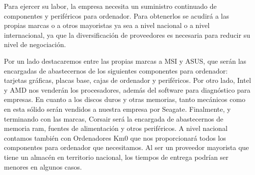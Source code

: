Para ejercer su labor, la empresa necesita un suministro continuado de componentes y periféricos para ordenador. Para obtenerlos se acudirá a las propias marcas o a otros mayoristas ya sea a nivel nacional o a nivel internacional, ya que la diversificación de proveedores es necesaria para reducir su nivel de negociación.

Por un lado destacaremos entre las propias marcas a MSI y ASUS, que serán las encargadas de abastecernos de los siguientes componentes para ordenador: tarjetas gráficas, placas base, cajas de ordenador y periféricos. Por otro lado, Intel y AMD nos venderán los procesadores, además del software para diagnóstico para empresas. En cuanto a los discos duros y otras memorias, tanto mecánicos como en esta sólido serán vendidos a nuestra empresa por Seagate. Finalmente, y terminando con las marcas, Corsair será la encargada de abastecernos de memoria ram, fuentes de alimentación y otros periféricos.	A nivel nacional contamos también con Ordenadores Km0 que nos proporcionará todos los componentes para ordenador que necesitamos. Al ser un proveedor mayorista que tiene un almacén en territorio nacional, los tiempos de entrega podrían ser menores en algunos casos.
